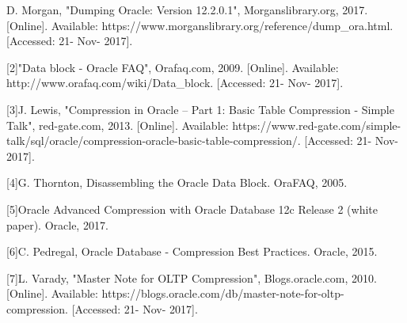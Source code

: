 \documentclass[10pt]{article}
\begin{document}
\begin{flushleft}
[1]D. Morgan, "Dumping Oracle: Version 12.2.0.1", Morganslibrary.org, 2017. [Online]. Available: https://www.morganslibrary.org/reference/dump_ora.html. [Accessed: 21- Nov- 2017]. \hfill \break

[2]"Data block - Oracle FAQ", Orafaq.com, 2009. [Online]. Available: http://www.orafaq.com/wiki/Data_block. [Accessed: 21- Nov- 2017]. \hfill \break

[3]J. Lewis, "Compression in Oracle – Part 1: Basic Table Compression - Simple Talk", red-gate.com, 2013. [Online]. Available: https://www.red-gate.com/simple-talk/sql/oracle/compression-oracle-basic-table-compression/. [Accessed: 21- Nov- 2017]. \hfill \break

[4]G. Thornton, Disassembling the Oracle Data Block. OraFAQ, 2005. \hfill \break

[5]Oracle Advanced Compression with Oracle Database 12c Release 2 (white paper). Oracle, 2017. \hfill \break

[6]C. Pedregal, Oracle Database - Compression Best Practices. Oracle, 2015. \hfill \break

[7]L. Varady, "Master Note for OLTP Compression", Blogs.oracle.com, 2010. [Online]. Available: https://blogs.oracle.com/db/master-note-for-oltp-compression. [Accessed: 21- Nov- 2017]. \hfill \break
\end{flushleft}
\end{document}
